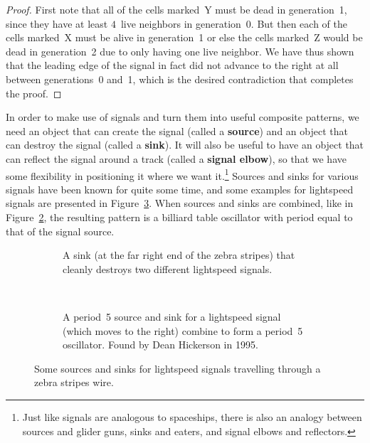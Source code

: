 \begin{proof}
	First note that all of the cells marked~Y must be dead in generation~1, since they have at least $4$~live neighbors in generation~0. But then each of the cells marked~X must be alive in generation~1 or else the cells marked~Z would be dead in generation~2 due to only having one live neighbor. We have thus shown that the leading edge of the signal in fact did not advance to the right at all between generations~0 and~1, which is the desired contradiction that completes the proof.
\end{proof}

In order to make use of signals and turn them into useful composite patterns, we need an object that can create the signal (called a \textbf{source}) and an object that can destroy the signal (called a \textbf{sink}). It will also be useful to have an object that can reflect the signal around a track (called a \textbf{signal elbow}), so that we have some flexibility in positioning it where we want it.\footnote{Just like signals are analogous to spaceships, there is also an analogy between sources and glider guns, sinks and eaters, and signal elbows and reflectors.} Sources and sinks for various signals have been known for quite some time, and some examples for lightspeed signals are presented in Figure~\ref{fig:signal_sink_source}. When sources and sinks are combined, like in Figure~\ref{fig:signal_oscillator}, the resulting pattern is a billiard table oscillator with period equal to that of the signal source.

\begin{figure}[!htb]
	\centering
	\begin{subfigure}{.43\textwidth}
		\centering{}
		\caption{A sink (at the far right end of the zebra stripes) that cleanly destroys two different lightspeed signals.}\label{fig:signal_sink}
	\end{subfigure} \ \ \ \ %
	\begin{subfigure}{.53\textwidth}
		\centering{}
		\caption{A period~5 source and sink for a lightspeed signal (which moves to the right) combine to form a period~5 oscillator. Found by Dean Hickerson in 1995.}\label{fig:signal_oscillator}
	\end{subfigure}
	\caption{Some sources and sinks for lightspeed signals travelling through a zebra stripes wire.}\label{fig:signal_sink_source}
\end{figure}

